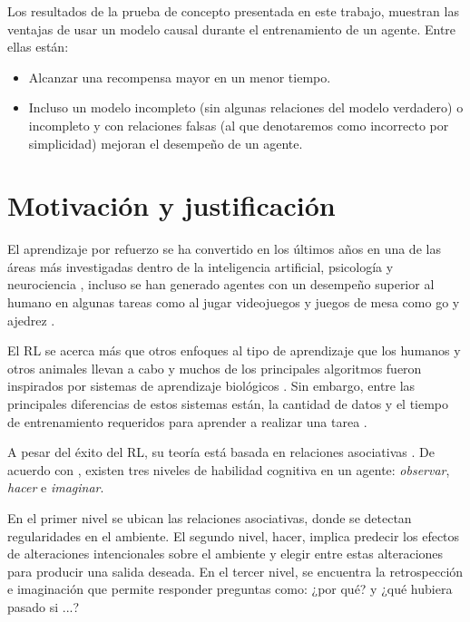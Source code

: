 Los resultados de la prueba de concepto presentada en este trabajo, 
muestran las ventajas de usar un modelo causal durante el entrenamiento de un agente. Entre ellas están: 
\begin{itemize}
    \item Alcanzar una recompensa mayor en un menor tiempo.
    \item Incluso un modelo incompleto (sin algunas relaciones del modelo verdadero) o incompleto y con relaciones falsas (al que denotaremos como incorrecto por simplicidad) mejoran el desempeño de un agente.
\end{itemize}

\section{Motivación y justificación}


El aprendizaje por refuerzo se ha convertido en los últimos años en una de las áreas
más investigadas dentro de la inteligencia artificial, psicología y neurociencia \cite{botvinick2019reinforcement}, incluso
se han generado agentes con un desempeño superior al humano en algunas tareas como  al jugar videojuegos \cite{mnih2015human, starcraft2019deepmind} y juegos de mesa como go y ajedrez \cite{Silver1140}.

El RL se acerca más que otros enfoques al tipo de aprendizaje que los humanos y otros
animales llevan a cabo y muchos de los principales algoritmos fueron inspirados por 
sistemas de aprendizaje biológicos \cite{sutton_barto_2018}. Sin embargo,
entre las principales diferencias de estos sistemas 
están, la cantidad de datos y el tiempo de entrenamiento
requeridos para aprender a realizar una tarea \cite{Silver1140}.

A pesar del éxito del RL, su teoría está basada 
en relaciones asociativas \cite{playingagainstnature2018}.
De acuerdo con \cite{pearl2018bookofwhy}, existen tres niveles de
habilidad cognitiva en un agente: \textit{observar}, \textit{hacer} e \textit{imaginar}.

En el primer nivel se ubican las 
relaciones asociativas, donde se detectan regularidades
en el ambiente.
El segundo nivel, hacer, implica predecir los 
efectos de alteraciones intencionales sobre el ambiente
y elegir entre estas alteraciones  para producir una
salida deseada. En el tercer nivel, se encuentra
la retrospección e imaginación que
permite responder preguntas como: ¿por qué?
y ¿qué hubiera pasado si ...?

